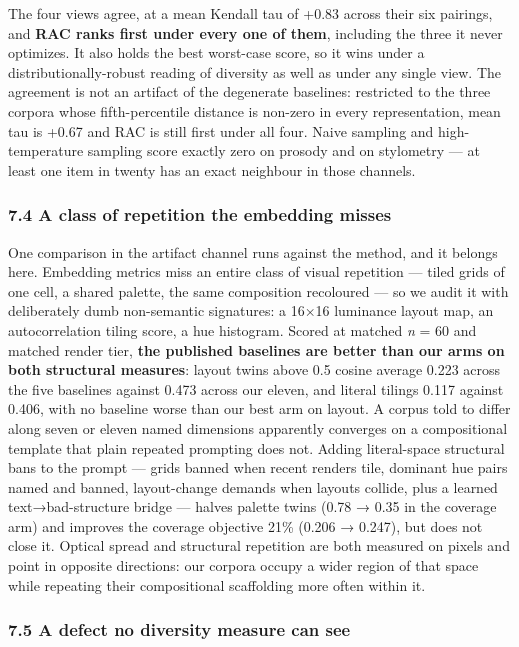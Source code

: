 \documentclass[
  10pt,
]{article}
\theoremstyle{plain}
\theoremstyle{definition}
\begin{document}
The four views agree, at a mean Kendall tau of +0.83 across their six
pairings, and \textbf{RAC ranks first under every one of them},
including the three it never optimizes. It also holds the best
worst-case score, so it wins under a distributionally-robust reading of
diversity as well as under any single view. The agreement is not an
artifact of the degenerate baselines: restricted to the three corpora
whose fifth-percentile distance is non-zero in every representation,
mean tau is +0.67 and RAC is still first under all four. Naive sampling
and high-temperature sampling score exactly zero on prosody and on
stylometry --- at least one item in twenty has an exact neighbour in
those channels.

\subsubsection{7.4 A class of repetition the embedding
misses}\label{74-a-class-of-repetition-the-embedding-misses}

One comparison in the artifact channel runs against the method, and it
belongs here. Embedding metrics miss an entire class of visual
repetition --- tiled grids of one cell, a shared palette, the same
composition recoloured --- so we audit it with deliberately dumb
non-semantic signatures: a 16×16 luminance layout map, an
autocorrelation tiling score, a hue histogram. Scored at matched
\emph{n} = 60 and matched render tier, \textbf{the published baselines
are better than our arms on both structural measures}: layout twins
above 0.5 cosine average 0.223 across the five baselines against 0.473
across our eleven, and literal tilings 0.117 against 0.406, with no
baseline worse than our best arm on layout. A corpus told to differ
along seven or eleven named dimensions apparently converges on a
compositional template that plain repeated prompting does not. Adding
literal-space structural bans to the prompt --- grids banned when recent
renders tile, dominant hue pairs named and banned, layout-change demands
when layouts collide, plus a learned text→bad-structure bridge ---
halves palette twins (0.78 → 0.35 in the coverage arm) and improves the
coverage objective 21\% (0.206 → 0.247), but does not close it. Optical
spread and structural repetition are both measured on pixels and point
in opposite directions: our corpora occupy a wider region of that space
while repeating their compositional scaffolding more often within it.

\subsubsection{7.5 A defect no diversity measure can
see}\label{75-a-defect-no-diversity-measure-can-see}
\end{document}
